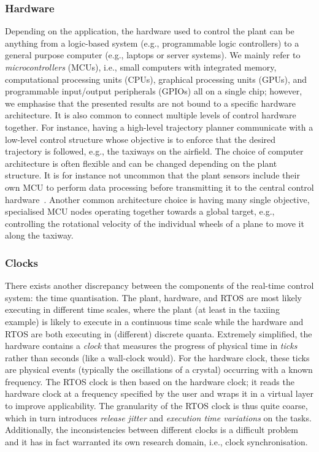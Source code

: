 \subsubsection{Hardware}%
%
Depending on the application, the hardware used to control the plant can be anything from a logic-based system (e.g., programmable logic controllers) to a general purpose computer (e.g., laptops or server systems).
We mainly refer to \emph{microcontrollers} (MCUs), i.e., small computers with integrated memory, computational processing units (CPUs), graphical processing units (GPUs), and programmable input/output peripherals (GPIOs) all on a single chip; however, we emphasise that the presented results are not bound to a specific hardware architecture.
It is also common to connect multiple levels of control hardware together.
For instance, having a high-level trajectory planner communicate with a low-level control structure whose objective is to enforce that the desired trajectory is followed, e.g., the taxiways on the airfield.
The choice of computer architecture is often flexible and can be changed depending on the plant structure.
It is for instance not uncommon that the plant sensors include their own MCU to perform data processing before transmitting it to the central control hardware~\addref{}.
Another common architecture choice is having many single objective, specialised MCU nodes operating together towards a global target, e.g., controlling the rotational velocity of the individual wheels of a plane to move it along the taxiway.

\subsubsection{Clocks}%
%
There exists another discrepancy between the components of the real-time control system: the time quantisation.
The plant, hardware, and RTOS are most likely executing in different time scales, where the plant (at least in the taxiing example) is likely to execute in a continuous time scale while the hardware and RTOS are both executing in (different) discrete quanta.
Extremely simplified, the hardware contains a \emph{clock} that measures the progress of physical time in \emph{ticks} rather than seconds (like a wall-clock would).
For the hardware clock, these ticks are physical events (typically the oscillations of a crystal) occurring with a known frequency.
The RTOS clock is then based on the hardware clock; it reads the hardware clock at a frequency specified by the user and wraps it in a virtual layer to improve applicability. 
The granularity of the RTOS clock is thus quite coarse, which in turn introduces \emph{release jitter} and \emph{execution time variations} on the tasks.
Additionally, the inconsistencies between different clocks is a difficult problem and it has in fact warranted its own research domain, i.e., clock synchronisation.

